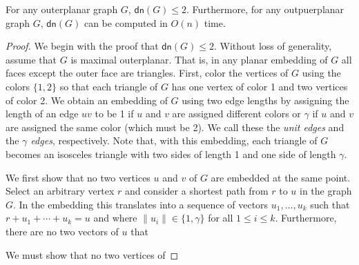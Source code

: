 \documentclass{article}
\newcommand{\dn}{\mathsf{dn}}
\begin{document}
\begin{thm}
For any outerplanar graph $G$, $\dn(G)\le 2$.  Furthermore, for any
outpuerplanar graph $G$, $\dn(G)$ can be computed in $O(n)$ time.
\end{thm}

\begin{proof} 

We begin with the proof that $\dn(G)\le 2$. Without loss of
generality, assume that $G$ is maximal outerplanar. That is, in any
planar embedding of $G$ all faces except the outer face are triangles.
First, color the vertices of $G$ using the colors $\{1,2\}$ so that
each triangle of $G$ has one vertex of color 1 and two vertices of
color 2.  We obtain an
embedding of $G$ using two edge lengths by assigning the length of an
edge $uv$ to be 1 if $u$ and $v$ are assigned different colors or
$\gamma$ if $u$ and $v$ are assigned the same color (which must be 2).
We call these the \emph{unit edges} and the \emph{$\gamma$ edges},
respectively.  Note that, with this embedding, each triangle of $G$
becomes an isosceles triangle with two sides of length 1 and one side
of length $\gamma$.

We first show that no two vertices $u$ and $v$ of $G$ are embedded at
the same point.  Select an arbitrary vertex $r$ and consider a
shortest path from $r$ to $u$ in the graph $G$.  In the embedding this
translates into a sequence of vectors $u_1,\ldots,u_k$ such that
$r+u_1+\cdots+u_k=u$ and where $\|u_i\|\in \{1,\gamma\}$ for all $1\le
i\le k$.  Furthermore, there are no two vectors of $u$ that 


We must show that no two vertices of

\end{proof}
\end{document}
